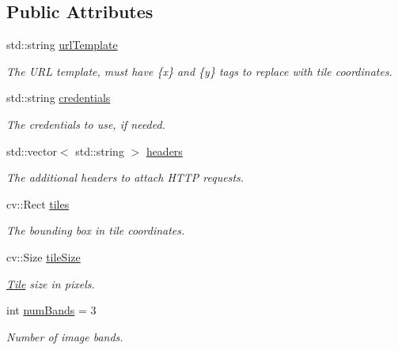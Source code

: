 \subsection*{Public Attributes}
\begin{DoxyCompactItemize}
\item 
std\+::string \hyperlink{structdg_1_1deepcore_1_1imagery_1_1_map_service_image_config_a8187c250438a019d1e5f9f100fd368e7}{url\+Template}
\begin{DoxyCompactList}\small\item\em The U\+RL template, must have \{x\} and \{y\} tags to replace with tile coordinates. \end{DoxyCompactList}\item 
std\+::string \hyperlink{structdg_1_1deepcore_1_1imagery_1_1_map_service_image_config_a6ca48897a8aa2f53e481777ca4d61ebf}{credentials}
\begin{DoxyCompactList}\small\item\em The credentials to use, if needed. \end{DoxyCompactList}\item 
std\+::vector$<$ std\+::string $>$ \hyperlink{structdg_1_1deepcore_1_1imagery_1_1_map_service_image_config_aa9694b5df7ea2e7fd581a88ddb76be8d}{headers}
\begin{DoxyCompactList}\small\item\em The additional headers to attach H\+T\+TP requests. \end{DoxyCompactList}\item 
cv\+::\+Rect \hyperlink{structdg_1_1deepcore_1_1imagery_1_1_map_service_image_config_ac91d37e373d148439e87b05fbb8d791c}{tiles}
\begin{DoxyCompactList}\small\item\em The bounding box in tile coordinates. \end{DoxyCompactList}\item 
cv\+::\+Size \hyperlink{structdg_1_1deepcore_1_1imagery_1_1_map_service_image_config_a4453f79e40168e535ea298d5d3428ec9}{tile\+Size}
\begin{DoxyCompactList}\small\item\em \hyperlink{structdg_1_1deepcore_1_1imagery_1_1_tile}{Tile} size in pixels. \end{DoxyCompactList}\item 
int \hyperlink{structdg_1_1deepcore_1_1imagery_1_1_map_service_image_config_a99145c60c1dc8f223224c14b6552e466}{num\+Bands} = 3
\begin{DoxyCompactList}\small\item\em Number of image bands. \end{DoxyCompactList}\item 

\end{DoxyCompactItemize}
